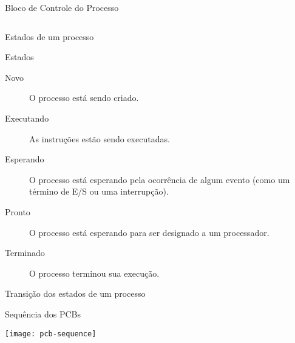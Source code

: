 \begin{frame}
\begin{columns}
{\begin{column}{5cm}
\begin{center}

  \scriptsize{Bloco de Controle do Processo}
  
  \smallskip

  
  

\end{center}

\end{column}
} %


\end{columns}

\end{frame}

\begin{frame}{Estados de um processo}
  
\begin{block}{Estados}
  \begin{description}
  \item[Novo] O processo está sendo criado.
  \item[Executando] As instruções estão sendo executadas.
  \item[Esperando] O processo está esperando pela ocorrência de algum
    evento (como um término de E/S ou uma interrupção).
  \item[Pronto] O processo está esperando para ser designado a um processador.
  \item[Terminado] O processo terminou sua execução.
  \end{description}
\end{block}

\end{frame}

\begin{frame}[fragile]{Transição dos estados de um processo}
  
	

\end{frame}

\begin{frame}{Sequência dos PCBs}

\begin{center}
	\texttt{[image: pcb-sequence]}
\end{center}
\end{frame}

